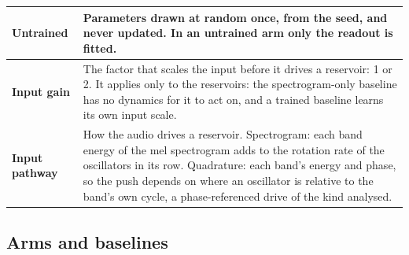 \documentclass[10pt]{article}
\begin{document}
{\begin{longtable}[]{@{}
  >{\raggedright\arraybackslash}p{}
  >{\raggedright\arraybackslash}p{}@{}}
\cmidrule{1-2}\textbf{Untrained} & Parameters drawn at random once, from
the seed, and never updated. In an untrained arm only the readout is
fitted. \\
\cmidrule{1-2}\textbf{Input gain} & The factor that scales the input
before it drives a reservoir: 1 or 2. It applies only to the reservoirs:
the spectrogram-only baseline has no dynamics for it to act on, and a
trained baseline learns its own input scale. \\
\cmidrule{1-2}\textbf{Input pathway} & How the audio drives a reservoir.
Spectrogram: each band energy of the mel spectrogram adds to the
rotation rate of the oscillators in its row. Quadrature: each band's
energy and phase, so the push depends on where an oscillator is relative
to the band's own cycle, a phase-referenced drive of the kind
\citet{adler1946} analysed. \\
\end{longtable}
}

\subsection{Arms and baselines}\label{arms-and-baselines}
\end{document}
